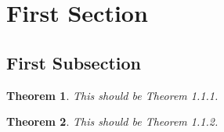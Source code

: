 \documentclass{article}
\newtheorem{theorem}{Theorem}[section]
\numberwithin{theorem}{subsection}
\begin{document}
\section{First Section}
\subsection{First Subsection}

\begin{theorem}
This should be Theorem 1.1.1.
\end{theorem}

\begin{theorem}
This should be Theorem 1.1.2.
\end{theorem}
\end{document}
